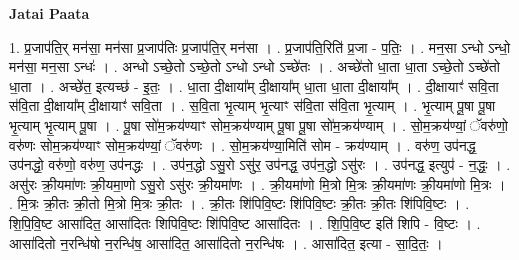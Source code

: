 \documentclass[17pt]{extarticle}
\begin{document}
\textbf{Jatai Paata} \newline

1. प्र॒जाप॑ति॒र् मन॑सा॒ मन॑सा प्र॒जाप॑तिः प्र॒जाप॑ति॒र् मन॑सा । . प्र॒जाप॑ति॒रिति॑ प्र॒जा - प॒तिः॒ । . मन॒सा ऽन्धो ऽन्धो॒ मन॑सा॒ मन॒सा ऽन्धः॑ । . अन्धो ऽच्छे॒तो ऽच्छे॒तो ऽन्धो ऽन्धो ऽच्छे॑तः । . अच्छे॑तो धा॒ता धा॒ता ऽच्छे॒तो ऽच्छे॑तो धा॒ता । . अच्छे॑त॒ इत्यच्छ॑ - इ॒तः॒ । . धा॒ता दी॒क्षाया᳚म् दी॒क्षाया᳚म् धा॒ता धा॒ता दी॒क्षाया᳚म् । . दी॒क्षायाꣳ॑ सवि॒ता स॑वि॒ता दी॒क्षाया᳚म् दी॒क्षायाꣳ॑ सवि॒ता । . स॒वि॒ता भृ॒त्याम् भृ॒त्याꣳ स॑वि॒ता स॑वि॒ता भृ॒त्याम् । . भृ॒त्याम् पू॒षा पू॒षा भृ॒त्याम् भृ॒त्याम् पू॒षा । . पू॒षा सो॑म॒क्रय॑ण्याꣳ सोम॒क्रय॑ण्याम् पू॒षा पू॒षा सो॑म॒क्रय॑ण्याम् । . सो॒म॒क्रय॑ण्यां॒ ॅवरु॑णो॒ वरु॑णः सोम॒क्रय॑ण्याꣳ सोम॒क्रय॑ण्यां॒ ॅवरु॑णः । . सो॒म॒क्रय॑ण्या॒मिति॑ सोम - क्रय॑ण्याम् । . वरु॑ण॒ उप॑नद्ध॒ उप॑नद्धो॒ वरु॑णो॒ वरु॑ण॒ उप॑नद्धः । . उप॑न॒द्धो ऽसु॒रो ऽसु॑र॒ उप॑नद्ध॒ उप॑न॒द्धो ऽसु॑रः । . उप॑नद्ध॒ इत्युप॑ - न॒द्धः॒ । . असु॑रः क्री॒यमा॑णः क्री॒यमा॒णो ऽसु॒रो ऽसु॑रः क्री॒यमा॑णः । . क्री॒यमा॑णो मि॒त्रो मि॒त्रः क्री॒यमा॑णः क्री॒यमा॑णो मि॒त्रः । . मि॒त्रः क्री॒तः क्री॒तो मि॒त्रो मि॒त्रः क्री॒तः । . क्री॒तः शि॑पिवि॒ष्टः शि॑पिवि॒ष्टः क्री॒तः क्री॒तः शि॑पिवि॒ष्टः । . शि॒पि॒वि॒ष्ट आसा॑दित॒ आसा॑दितः शिपिवि॒ष्टः शि॑पिवि॒ष्ट आसा॑दितः । . शि॒पि॒वि॒ष्ट इति॑ शिपि - वि॒ष्टः । . आसा॑दितो न॒रन्धि॑षो न॒रन्धि॑ष॒ आसा॑दित॒ आसा॑दितो न॒रन्धि॑षः । . आसा॑दित॒ इत्या - सा॒दि॒तः॒ । \newline
\end{document}
